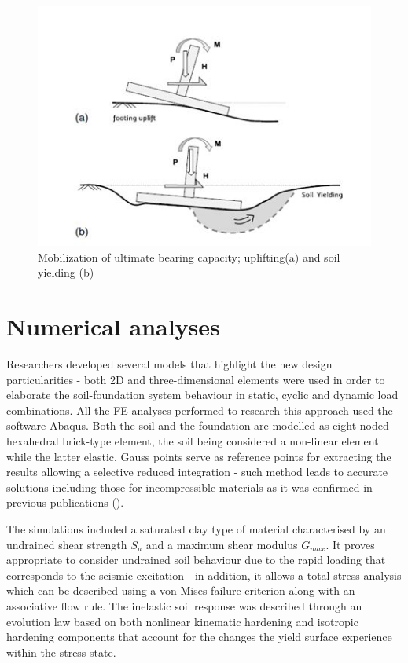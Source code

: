 \documentclass[10pt,a4paper]{report}
\begin{document}
\begin{figure}[h!]
	\centering
	\includegraphics[width=0.8\linewidth]{"uplift"}
	\caption{Mobilization of ultimate bearing capacity; uplifting(a) and soil yielding (b)}
	\label{uplift}
\end{figure}

\section{Numerical analyses}
Researchers developed several models that highlight the new design particularities - both 2D and three-dimensional elements were used in order to elaborate the soil-foundation system behaviour in static, cyclic and dynamic load combinations. All the FE analyses performed to research this approach used the software Abaqus. Both the soil and the foundation are modelled as eight-noded hexahedral brick-type element, the soil being considered a non-linear element while the latter elastic. Gauss points serve as reference points for extracting the results allowing a selective reduced integration - such method leads to accurate solutions including those for incompressible materials as it was confirmed in previous publications (\cite{gazetas2013nonlinear}).

The simulations included a saturated clay type of material characterised by an undrained shear strength $S_u$ and a maximum shear modulus $G_{max}$. It proves appropriate to consider undrained soil behaviour due to the rapid loading that corresponds to the seismic excitation - in addition, it allows a total stress analysis which can be described using a von Mises failure criterion along with an associative flow rule. The inelastic soil response was described through an evolution law based on both nonlinear kinematic hardening and isotropic  hardening components that account for the changes the yield surface experience within the stress state.
\end{document}
